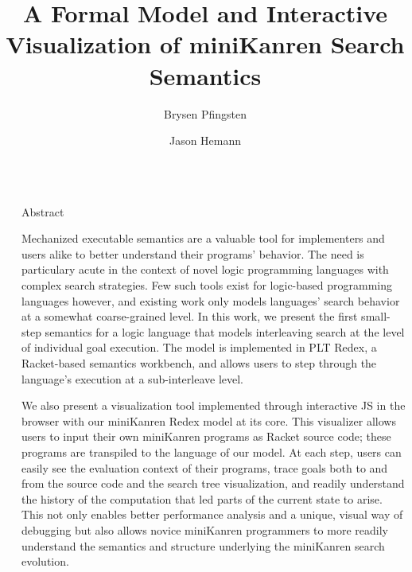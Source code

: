 \documentclass[final]{beamer}
\title{A Formal Model and Interactive Visualization of miniKanren Search Semantics}
\author{Brysen Pfingsten \and Jason Hemann}
\newlength{\sepwidth}
\newlength{\colwidth}
\newcommand{\separatorcolumn}{\begin{column}{\sepwidth}\end{column}}
\begin{document}


\begin{frame}[t]
\begin{columns}[t]
\separatorcolumn

\begin{column}{\colwidth}

  \begin{block}{Abstract}

Mechanized executable semantics are a valuable tool for implementers and users alike to better understand their programs' behavior. The need is particulary acute in the context of novel logic programming languages with complex search strategies. Few such tools exist for logic-based programming languages however, and existing work only models languages' search behavior at a somewhat coarse-grained level. In this work, we present the first small-step semantics for a logic language that models interleaving search at the level of individual goal execution. The model is implemented in PLT Redex, a Racket-based semantics workbench, and allows users to step through the language's execution at a sub-interleave level.

We also present a visualization tool implemented through interactive JS in the browser with our miniKanren Redex model at its core. This visualizer allows users to input their own miniKanren programs as Racket source code; these programs are transpiled to the language of our model. At each step, users can easily see the evaluation context of their programs, trace goals both to and from the source code and the search tree visualization, and readily understand the history of the computation that led parts of the current state to arise. This not only enables better performance analysis and a unique, visual way of debugging but also allows novice miniKanren programmers to more readily understand the semantics and structure underlying the miniKanren search evolution.

  \end{block}
  

\end{column}
\end{columns}
\end{frame}
\end{document}
